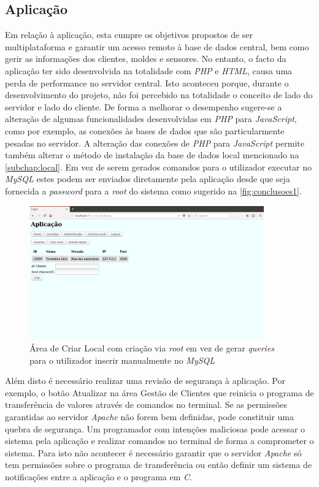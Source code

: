\documentclass[11pt,twoside,a4paper]{report}
\begin{document}
\subsection{Aplicação}
Em relação à aplicação, esta cumpre os objetivos propostos de ser multiplataforma e garantir um acesso remoto à base de dados central, bem como gerir as informações dos clientes, moldes e sensores. No entanto, o facto da aplicação ter sido desenvolvida na totalidade com \textit{PHP} e \textit{HTML}, causa uma perda de performance no servidor central. Isto aconteceu porque, durante o desenvolvimento do projeto, não foi percebido na totalidade o conceito de lado do servidor e lado do cliente. De forma a melhorar o desempenho sugere-se a alteração de algumas funcionalidades desenvolvidas em \textit{PHP} para \textit{JavaScript}, como por exemplo, as conexões às bases de dados que são particularmente pesadas no servidor. A alteração das conexões de \textit{PHP} para \textit{JavaScript} permite também alterar o método de instalação da base de dados local mencionado na \autoref{subchap:local}. Em vez de serem gerados comandos para o utilizador executar no \textit{MySQL} estes podem ser enviados diretamente pela aplicação desde que seja fornecida a \textit{password} para a \textit{root} do sistema como sugerido na \autoref{fig:conclusoes1}.
\begin{figure}[H]
	\begin{center}
		\includegraphics[width=0.9\textwidth]{futuro01} %
		\caption{Área de Criar Local com criação via \textit{root} em vez de gerar \textit{queries} para o utilizador inserir manualmente no \textit{MySQL}}
		\label{fig:conclusoes1}
	\end{center}
\end{figure}
Além disto é necessário realizar uma revisão de segurança à aplicação. Por exemplo, o botão Atualizar na área Gestão de Clientes que reinicia o programa de transferência de valores através de comandos no terminal. Se as permissões garantidas ao servidor \textit{Apache} não forem bem definidas, pode constituir uma quebra de segurança. Um programador com intenções maliciosas pode acessar o sistema pela aplicação e realizar comandos no terminal de forma a comprometer o sistema. Para isto não acontecer é necessário garantir que o servidor \textit{Apache} só tem permissões sobre o programa de transferência ou então definir um sistema de notificações entre a aplicação e o programa em \textit{C}.\\
\end{document}
